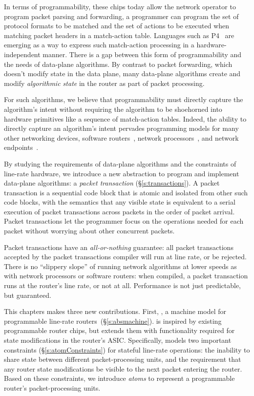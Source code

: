 In terms of programmability, these chips today allow the network operator to
program packet parsing and forwarding, \ie a programmer can program the set of
protocol formats to be matched and the set of actions to be executed when
matching packet headers in a match-action table. Languages such as P4~\cite{p4}
are emerging as a way to express such match-action processing in a
hardware-independent manner. There is a gap between this form of
programmability and the needs of data-plane algorithms. By contrast to packet
forwarding, which doesn't modify state in the data plane, many data-plane
algorithms create and modify {\em algorithmic state} in the router as part of
packet processing.

For such algorithms, we believe that programmability must directly capture the
algorithm's intent without requiring the algorithm to be shoehorned into
hardware primitives like a sequence of match-action tables. Indeed, the ability
to directly capture an algorithm's intent pervades programming models for many
other networking devices, \eg software routers~\cite{click}, network
processors~\cite{packetc}, and network endpoints~\cite{qdisc}.

By studying the requirements of data-plane algorithms and the constraints of
line-rate hardware, we introduce a new abstraction to program and implement
data-plane algorithms: a {\em packet transaction} (\S\ref{s:transactions}). A
packet transaction is a sequential code block that is atomic and isolated from
other such code blocks, with the semantics that any visible state is equivalent
to a serial execution of packet transactions across packets in the order of
packet arrival.  Packet transactions let the programmer focus on the operations
needed for each packet without worrying about other concurrent packets.

Packet transactions have an \textit{all-or-nothing} guarantee: all packet
transactions accepted by the packet transactions compiler will run at line
rate, or be rejected.  There is no ``slippery slope'' of running network
algorithms at lower speeds as with network processors or software routers: when
compiled, a packet transaction runs at the router's line rate, or not at all.
Performance is not just predictable, but guaranteed.

This chapters makes three new contributions.  First, {\em \absmachine}, a
machine model for programmable line-rate routers~(\S\ref{s:absmachine}).
\absmachine is inspired by existing programmable router chips, but extends them
with functionality required for state modifications in the router's ASIC.
Specifically, \absmachine models two important constraints
(\S\ref{s:atomConstraints}) for stateful line-rate operations: the inability to
share state between different packet-processing units, and the requirement that
any router state modifications be visible to the next packet entering the
router. Based on these constraints, we introduce {\em atoms} to represent a
programmable router's packet-processing units.


